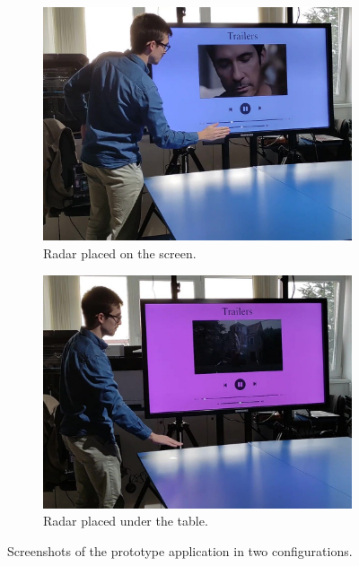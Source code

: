 \begin{figure}[bt]
\centering
\begin{subfigure}{.49\textwidth}
    \centering
    \includegraphics[width=\linewidth]{Figures/RadarChallenges/Application/app-screen-2.pdf}  
    \vspace{-15pt}
    \captionsetup{width=.9\linewidth}
    \caption{Radar placed on the screen.}
    \label{fig:radar-challenges:screen}
\end{subfigure}
\begin{subfigure}{.49\textwidth}
    \centering
    \includegraphics[width=\linewidth]{Figures/RadarChallenges/Application/app-table-2.pdf}  
    \vspace{-15pt}
    \captionsetup{width=.9\linewidth}
    \caption{Radar placed under the table.}
    \label{fig:radar-challenges:application:table}
\end{subfigure}
\vspace{-8pt}
\caption{Screenshots of the prototype application in two configurations.}
\label{fig:radar-challenges:application}
\end{figure}

